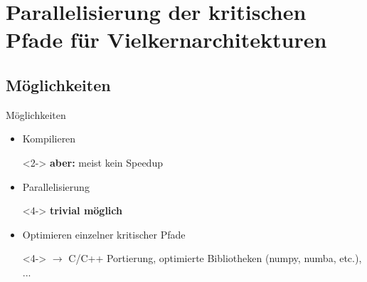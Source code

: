 \section{Parallelisierung der kritischen Pfade für Vielkernarchitekturen}

\subsection{Möglichkeiten}
\begin{frame}{Möglichkeiten}


	\begin{itemize}
		\item Kompilieren
		\begin{uncoverenv}<2->
			\textbf{aber:} meist kein Speedup
		\end{uncoverenv}
		\item<3-> Parallelisierung
		\begin{uncoverenv}<4->
			\textbf{trivial möglich}
		\end{uncoverenv}
		\item<5-> Optimieren einzelner kritischer Pfade\\
		\begin{uncoverenv}<4->
			$\rightarrow$ C/C++ Portierung, optimierte Bibliotheken (numpy, numba, etc.), ...
		\end{uncoverenv}
	\end{itemize}
\end{frame}